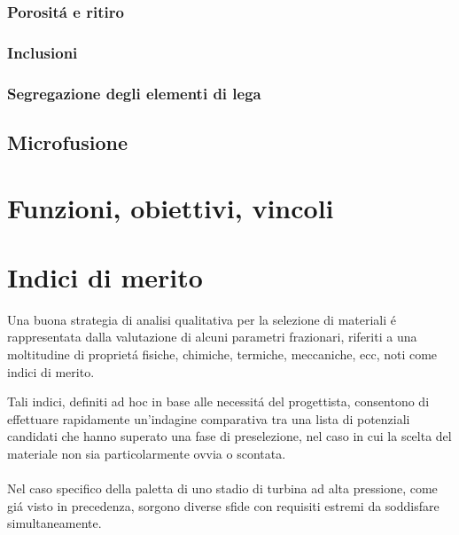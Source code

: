 \documentclass{article}
\begin{document}
        \clearpage 

            \subsubsection{Porositá e ritiro\label{Casting_difetti_porosita}}

            \clearpage 

            \subsubsection{Inclusioni\label{Casting_difetti_inclusioni}}

            \clearpage 

            \subsubsection{Segregazione degli elementi di lega\label{Casting_difetti_segregazione}}
    
            \clearpage

        \subsection{Microfusione\label{Casting_microfusione}}



        \clearpage

    \section{Funzioni, obiettivi, vincoli\label{Funzioni_ob_vinc}}


    \clearpage 


    \section{Indici di merito\label{material_index}}

        Una buona strategia di analisi qualitativa per la selezione di materiali é rappresentata dalla valutazione di alcuni parametri frazionari, riferiti a una moltitudine di proprietá fisiche, chimiche, termiche, meccaniche, ecc, noti come indici di merito.
        
        Tali indici, definiti ad hoc in base alle necessitá del progettista, consentono di effettuare rapidamente un’indagine comparativa tra una lista di potenziali candidati che hanno superato una fase di preselezione, nel caso in cui la scelta del materiale non sia particolarmente ovvia o scontata. 
        \\ \\
        Nel caso specifico della paletta di uno stadio di turbina ad alta pressione, come giá visto in precedenza, sorgono diverse sfide con requisiti estremi da soddisfare simultaneamente.
\end{document}
